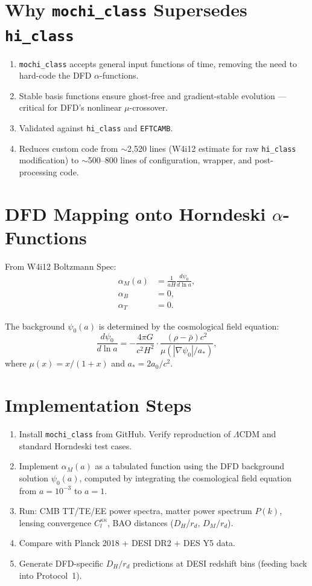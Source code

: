 \documentclass[11pt]{article}
\newcommand{\LCDM}{\Lambda\text{CDM}}
\begin{document}
\section{Why \texttt{mochi\_class} Supersedes \texttt{hi\_class}}

\begin{enumerate}[nosep]
\item \texttt{mochi\_class} accepts general input functions of time,
  removing the need to hard-code the DFD $\alpha$-functions.
\item Stable basis functions ensure ghost-free and gradient-stable
  evolution --- critical for DFD's nonlinear $\mu$-crossover.
\item Validated against \texttt{hi\_class} and \texttt{EFTCAMB}.
\item Reduces custom code from $\sim$2,520 lines (W4i12 estimate for
  raw \texttt{hi\_class} modification) to $\sim$500--800 lines of
  configuration, wrapper, and post-processing code.
\end{enumerate}

\section{DFD Mapping onto Horndeski $\alpha$-Functions}

From W4i12 Boltzmann Spec:
\begin{align}
\alpha_M(a) &= \frac{1}{aH}\frac{d\psi_0}{d\ln a}, \\
\alpha_B &= 0, \\
\alpha_T &= 0.
\end{align}

The background $\psi_0(a)$ is determined by the cosmological field
equation:
\begin{equation}
\frac{d\psi_0}{d\ln a} = -\frac{4\pi G}{c^2 H^2} \cdot
\frac{(\rho - \bar{\rho}) c^2}{\mu(|\nabla\psi_0|/a_*)},
\end{equation}
where $\mu(x) = x/(1+x)$ and $a_* = 2a_0/c^2$.

\section{Implementation Steps}

\begin{enumerate}[label=\textbf{B.\arabic*:}]
\item Install \texttt{mochi\_class} from GitHub. Verify reproduction of
  $\LCDM$ and standard Horndeski test cases.
\item Implement $\alpha_M(a)$ as a tabulated function using the DFD
  background solution $\psi_0(a)$, computed by integrating the
  cosmological field equation from $a = 10^{-3}$ to $a = 1$.
\item Run: CMB TT/TE/EE power spectra, matter power spectrum $P(k)$,
  lensing convergence $C_l^{\kappa\kappa}$, BAO distances
  ($D_H/r_d$, $D_M/r_d$).
\item Compare with Planck 2018 + DESI DR2 + DES Y5 data.
\item Generate DFD-specific $D_H/r_d$ predictions at DESI redshift bins
  (feeding back into Protocol~1).
\end{enumerate}
\end{document}
